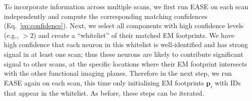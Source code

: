 \documentclass[10pt,letterpaper]{article}
\begin{document}
{To incorporate information across multiple scans, we first run EASE on each scan independently and compute the corresponding matching confidences (Eq.~\ref{eq:confidence}).
Next, we select all components with high confidence levels (e.g., $>2$) and create a ``whitelist'' of their matched EM footprints. 
We have high confidence that each neuron in this whitelist is well-identified and has strong signal in at least one scan; thus these neurons are likely to contribute significant signal to other scans, at the specific locations where their EM footprint intersects with the other functional imaging planes. Therefore in the next step, we run EASE again on each scan, this time only initializing EM footprints $\bm{p}_i$ with IDs that appear in the whitelist.  As before, these steps can be iterated. 





}
\end{document}
